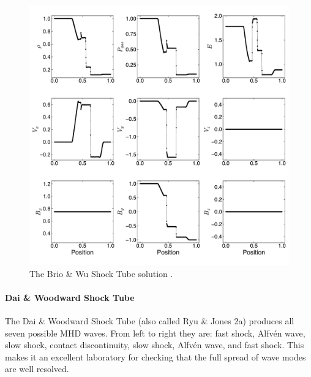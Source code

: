 \begin{figure}[ht!]
    \includegraphics[width=\linewidth]{assets/3-mhd-tests/b&w.pdf}
    \caption{The Brio \& Wu Shock Tube solution \citep{brio_wu_1988}.
    }
    \label{fig:brio-and-wu}
\end{figure}

\paragraph{Dai \& Woodward Shock Tube}

The Dai \& Woodward Shock Tube (also called Ryu \& Jones 2a) \citep{dai_woodward_1998, ryu_jones_1995} produces all seven possible MHD waves. From left to right they are: fast shock, Alfvén wave, slow shock, contact discontinuity, slow shock, Alfvén wave, and fast shock. This makes it an excellent laboratory for checking that the full spread of wave modes are well resolved.

